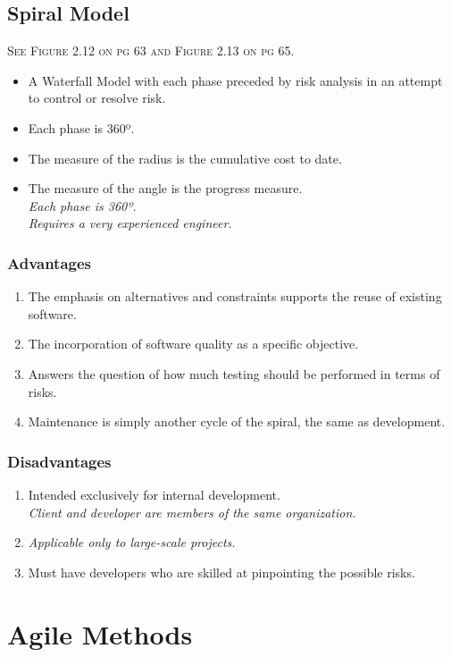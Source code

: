 \documentclass{report}
\begin{document}
		\subsection{Spiral Model}
			\textsc{See Figure 2.12 on pg 63 and Figure 2.13 on pg 65.}
			\begin{itemize}
				\item A Waterfall Model with each phase preceded by risk analysis in an attempt to control or resolve risk.
				\item Each phase is 360º.
				\item The measure of the radius is the cumulative cost to date.
				\item The measure of the angle is the progress measure.\\
					\textit{Each phase is 360º.\\
								Requires a very experienced engineer.}
			\end{itemize}
			\subsubsection{Advantages}
				\begin{enumerate}
					\item The emphasis on alternatives and constraints supports the reuse of existing software.
					\item The incorporation of software quality as a specific objective.
					\item Answers the question of how much testing should be performed in terms of risks.
					\item Maintenance is simply another cycle of the spiral, the same as development.
				\end{enumerate}
			\subsubsection{Disadvantages}
				\begin{enumerate}
					\item Intended exclusively for internal development.\\
						\textit{Client and developer are members of the same organization.}
					\item \emph{Applicable only to large-scale projects.}
					\item Must have developers who are skilled at pinpointing the possible risks.
				\end{enumerate}
		\section{Agile Methods}
\end{document}
